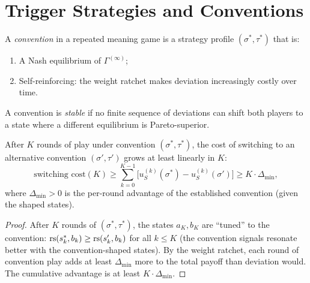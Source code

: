 \section{Trigger Strategies and Conventions}

\begin{definition}
\label{def:convention}
A \emph{convention} in a repeated meaning game is a strategy profile
$(\sigma^*, \tau^*)$ that is:
\begin{enumerate}
  \item A Nash equilibrium of $\Gamma^{(\infty)}$;
  \item Self-reinforcing: the weight ratchet makes deviation increasingly
        costly over time.
\end{enumerate}
A convention is \emph{stable} if no finite sequence of deviations can shift
both players to a state where a different equilibrium is Pareto-superior.
\end{definition}

\begin{theorem}
\label{thm:convention-lock-in}
After $K$ rounds of play under convention $(\sigma^*, \tau^*)$, the cost
of switching to an alternative convention $(\sigma', \tau')$ grows at least
linearly in $K$:
\[
  \text{switching cost}(K) \geq
  \sum_{k=0}^{K-1} \bigl[u_S^{(k)}(\sigma^*) - u_S^{(k)}(\sigma')\bigr]
  \geq K \cdot \Delta_{\min},
\]
where $\Delta_{\min} > 0$ is the per-round advantage of the established
convention (given the shaped states).
\end{theorem}

\begin{proof}
After $K$ rounds of $(\sigma^*, \tau^*)$, the states $a_K, b_K$ are
``tuned'' to the convention: $\mathrm{rs}(s_k^*, b_k) \geq \mathrm{rs}(s_k', b_k)$ for
all $k \leq K$ (the convention signals resonate better with the
convention-shaped states).  By the weight ratchet, each round of
convention play adds at least $\Delta_{\min}$ more to the total payoff
than deviation would.  The cumulative advantage is at least
$K \cdot \Delta_{\min}$.
\end{proof}

